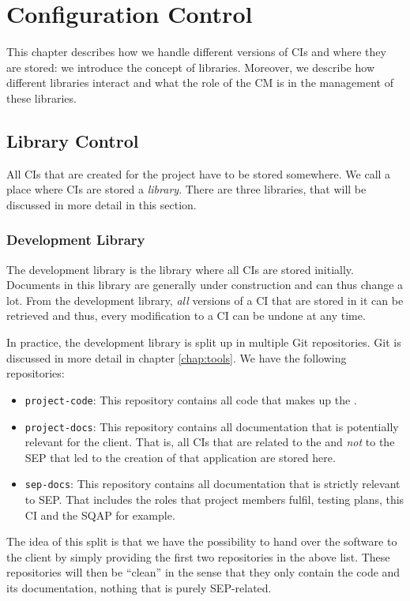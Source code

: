\chapter{Configuration Control}
\label{chap:configurationcontrol}
This chapter describes how we handle different versions of CIs and where they are stored: we introduce the concept of libraries. Moreover, we describe how different libraries interact and what the role of the CM is in the management of these libraries.

\section{Library Control}
\label{sec:configcontrol-library}
All CIs that are created for the \projectname{} project have to be stored somewhere. We call a place where CIs are stored a \emph{library}. There are three libraries, that will be discussed in more detail in this section.

\subsection{Development Library}
\label{subsec:configcontrol-library-dev}
The development library is the library where all CIs are stored initially. Documents in this library are generally under construction and can thus change a lot. From the development library, \emph{all} versions of a CI that are stored in it can be retrieved and thus, every modification to a CI can be undone at any time.

In practice, the development library is split up in multiple Git repositories. Git is discussed in more detail in chapter \ref{chap:tools}. We have the following repositories:
\begin{itemize}
	\item \texttt{project-code}: This repository contains all code that makes up the \applicationname{}.
	\item \texttt{project-docs}: This repository contains all documentation that is potentially relevant for the client. That is, all CIs that are related to the \applicationname{} and \emph{not} to the SEP that led to the creation of that application are stored here.
	\item \texttt{sep-docs}: This repository contains all documentation that is strictly relevant to SEP. That includes the roles that project members fulfil,  testing plans, this CI and the SQAP for example.
\end{itemize}
The idea of this split is that we have the possibility to hand over the software to the client by simply providing the first two repositories in the above list. These repositories will then be ``clean'' in the sense that they only contain the code and its documentation, nothing that is purely SEP-related.

